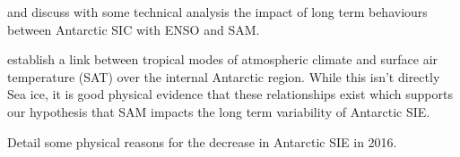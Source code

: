 \cite{Simpkins2012SeasonalConcentration} and \cite{Kohyama2016AntarcticVariability} discuss with some technical analysis the impact of long term behaviours between Antarctic SIC with ENSO and SAM.



\cite{Clem2020RecordDecades} establish a link between tropical modes of atmospheric climate and surface air temperature (SAT) over the internal Antarctic region. While this isn't directly Sea ice, it is good physical evidence that these relationships exist which supports our hypothesis that SAM impacts the long term variability of Antarctic SIE.

\cite{Turner2020a} Detail some physical reasons for the decrease in Antarctic SIE in 2016.